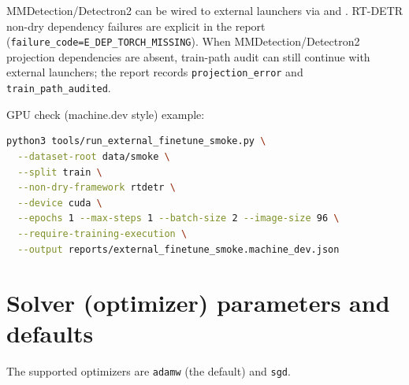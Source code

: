 MMDetection/Detectron2 can be wired to external launchers via
 and .
RT-DETR non-dry dependency failures are explicit in the report
(\texttt{failure\_code=E\_DEP\_TORCH\_MISSING}).
When MMDetection/Detectron2 projection dependencies are absent, train-path audit can still continue with external launchers; the report records \texttt{projection\_error} and \texttt{train\_path\_audited}.

GPU check (machine.dev style) example:
\begin{lstlisting}[language=bash]
python3 tools/run_external_finetune_smoke.py \
  --dataset-root data/smoke \
  --split train \
  --non-dry-framework rtdetr \
  --device cuda \
  --epochs 1 --max-steps 1 --batch-size 2 --image-size 96 \
  --require-training-execution \
  --output reports/external_finetune_smoke.machine_dev.json
\end{lstlisting}

\section{Solver (optimizer) parameters and defaults}
The supported optimizers are \texttt{adamw} (the default) and \texttt{sgd}.

